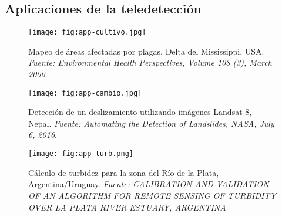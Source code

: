 
\subsection{Aplicaciones de la teledetección}

\begin{frame}{}
  \begin{figure}
    \centering
    \texttt{[image: fig:app-cultivo.jpg]}
    \caption{Mapeo de áreas afectadas por plagas, Delta del Mississippi, USA. \emph{Fuente: Environmental Health Perspectives, Volume 108 (3), March 2000}.}
    \label{}
  \end{figure}
\end{frame}

\begin{frame}{}
  \begin{figure}
    \centering
    \texttt{[image: fig:app-cambio.jpg]}
    \caption{Detección de un deslizamiento utilizando imágenes Landsat 8, Nepal. \emph{Fuente: Automating the Detection of Landslides, NASA, July 6, 2016}.}
    \label{}
  \end{figure}
\end{frame}

\begin{frame}{}
  \begin{figure}
    \centering
    \texttt{[image: fig:app-turb.png]}
    \caption{Cálculo de turbidez para la zona del Río de la Plata, Argentina/Uruguay. \emph{Fuente: CALIBRATION AND VALIDATION OF AN ALGORITHM FOR REMOTE SENSING OF TURBIDITY OVER LA PLATA RIVER ESTUARY, ARGENTINA}}
    \label{}
  \end{figure}
\end{frame}

